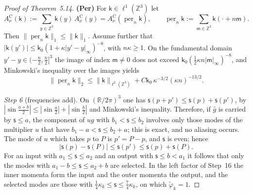 \documentclass[11pt,letterpaper,reqno]{amsart}
\theoremstyle{definition}
\begin{document}
\begin{proof}[Proof of Theorem~5.14]
\textbf{(Per)} For $\mathsf k\in\ell^1(\mathbb Z^3)$ let
\begin{equation*}
A^{\mathrm C}_\nu(\mathsf k):=\sum_{y\in\mathbb Z^3}\mathsf k(y)\,A^{\mathrm C}_\nu(y)=A^{\mathrm C}_\nu(\operatorname{per}_n\mathsf k),\qquad\operatorname{per}_n\mathsf k:=\sum_{\mathsf m\in\mathbb Z^3}\mathsf k(\cdot+n\mathsf m).
\end{equation*}
Then $\|\operatorname{per}_n\mathsf k\|_1\le\|\mathsf k\|_1$.
Assume further that $|\mathsf k(y')|\le\mathsf k_0(1+\kappa|y'-y|_\infty)^{-8}$, with $n\kappa\ge1$.
On the fundamental domain $y'-y\in(-\frac n2,\frac n2]^3$ the image of index $\mathsf m\ne0$ does not exceed $\mathsf k_0(\frac12\kappa n|\mathsf m|_\infty)^{-8}$, and Minkowski's inequality over the images yields
\begin{equation*}
\|\operatorname{per}_n\mathsf k\|_2\le\|\mathsf k\|_{\ell^2(\mathbb Z^3)}+C\mathsf k_0\,\kappa^{-3/2}(\kappa n)^{-13/2}.
\end{equation*}

\emph{Step 6} (frequencies add).
On $(\mathbb R/2\pi)^3$ one has $\mathsf s(p+p')\le\mathsf s(p)+\mathsf s(p')$, by $|\sin\frac{a+b}{2}|\le|\sin\frac a2|+|\sin\frac b2|$ and Minkowski's inequality.
Therefore, if $\hat g$ is carried by $\mathsf s\le a$, the component of $ug$ with $b_1<\mathsf s\le b_2$ involves only those modes of the multiplier $u$ that have $b_1-a<\mathsf s\le b_2+a$;
this is exact, and no aliasing occurs.
The mode of $u$ which takes $p$ to $P$ is $p'=P-p$, and $\mathsf s$ is even;
hence
\begin{equation*}
|\mathsf s(p)-\mathsf s(P)|\le\mathsf s(p')\le\mathsf s(p)+\mathsf s(P).
\end{equation*}
For an input with $a_1\le\mathsf s\le a_2$ and an output with $\mathsf s\le b<a_1$ it follows that only the modes with $a_1-b\le\mathsf s\le a_2+b$ are selected.
In the left factor of Step~16 the inner momenta form the input and the outer momenta the output, and the selected modes are those with $\frac14\kappa_k\le\mathsf s\le\frac74\kappa_k$, on which $\tilde\varphi_k=1$.


\end{proof}
\end{document}
